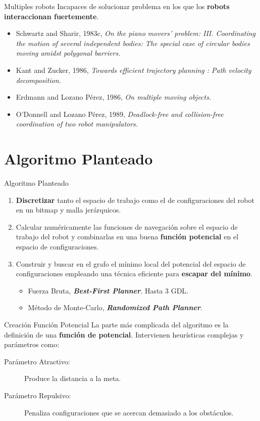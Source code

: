 \documentclass{beamer}
\begin{document}
\begin{frame}{Multiples robots}
Incapaces de solucionar problema en los que los \textbf{robots interaccionan fuertemente}.

	\begin{itemize}
	\item Schwartz and Sharir, 1983c, \textit{On the piano movers' problem: III. Coordinating the motion of several independent bodies: The special case of circular bodies moving amidst polygonal barriers.}
	\item Kant and Zucker, 1986, \textit{Towards efficient trajectory planning : Path velocity decomposition.}
	\item Erdmann and Lozano Pérez, 1986, \textit{On multiple moving objects.}
	\item O'Donnell and Lozano Pérez, 1989, \textit{Deadlock-free and collision-free coordination of two robot manipulators.}
	\end{itemize}
\end{frame}

\section{Algoritmo Planteado}

\begin{frame}{Algoritmo Planteado}
	\begin{enumerate}
		\item \textbf{Discretizar} tanto el espacio de trabajo como el de configuraciones del robot en un bitmap y malla jerárquicos.
		\item Calcular numéricamente las funciones de navegación sobre el espacio de trabajo del robot y combinarlas en una buena \textbf{función potencial} en el espacio de configuraciones.
		\item Construir y buscar en el grafo el mínimo local del potencial del espacio de configuraciones empleando una técnica eficiente para \textbf{escapar del mínimo}.
		\begin{itemize}
		\item Fuerza Bruta, \textit{\textbf{Best-First Planner}}. Hasta 3 GDL.
		\item Método de Monte-Carlo, \textit{\textbf{Randomized Path Planner}}.
		\end{itemize}
	\end{enumerate}
\end{frame}

\begin{frame}{Creación Función Potencial}
La parte más complicada del algoritmo es la definición de una \textbf{función de potencial}. Intervienen heurísticas complejas y parámetros como:

\medskip

\begin{description}
	\item[Parámetro Atractivo:] Produce la distancia a la meta.
	\item[Parámetro Repulsivo:] Penaliza configuraciones que se acercan demasiado a los obstáculos.
\end{description}

\end{frame}
\end{document}
